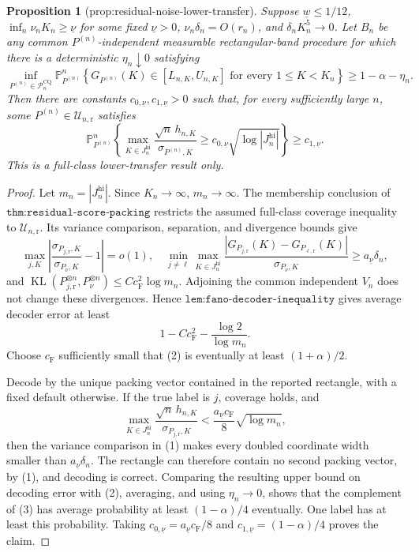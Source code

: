 \documentclass{article}
\newtheorem{proposition}{Proposition}
\begin{document}
\begin{proposition}[prop:residual-noise-lower-transfer]\label{prop:residual-noise-lower-transfer}
Suppose \(\underline w\leq1/12\), \(\inf_n\nu_nK_n\geq\underline\nu\) for some fixed \(\underline\nu>0\), \(\nu_n\delta_n=O(r_n)\), and \(\delta_nK_n^5\to0\).  Let \(B_n\) be any common \(P^{(n)}\)-independent measurable rectangular-band procedure for which there is a deterministic \(\eta_n\downarrow0\) satisfying
\[
 \inf_{P^{(n)}\in\mathcal P_n^{\mathrm{CQ}}}
 \mathbb P_{P^{(n)}}^n\!\left\{G_{P^{(n)}}(K)\in[L_{n,K},U_{n,K}]
 \text{ for every }1\leq K<K_n\right\}\geq1-\alpha-\eta_n.
\]
Then there are constants \(c_{0,\underline\nu},c_{1,\underline\nu}>0\) such that, for every sufficiently large \(n\), some \(P^{(n)}\in\mathcal U_{n,\mathrm r}\) satisfies
\[
 \mathbb P_{P^{(n)}}^n\!\left\{
 \max_{K\in J_n^{\mathrm{hi}}}\frac{\sqrt n\,h_{n,K}}{\sigma_{P^{(n)},K}}
 \geq c_{0,\underline\nu}\sqrt{\log|J_n^{\mathrm{hi}}|}\right\}
 \geq c_{1,\underline\nu}.
\]
This is a full-class lower-transfer result only.
\end{proposition}
\begin{proof}
Let \(m_n=|J_n^{\mathrm{hi}}|\).  Since \(K_n\to\infty\), \(m_n\to\infty\).  The membership conclusion of \(\texttt{thm:residual-score-packing}\) restricts the assumed full-class coverage inequality to \(\mathcal U_{n,\mathrm r}\).  Its variance comparison, separation, and divergence bounds give
\[
 \max_{j,K}\left|\frac{\sigma_{P_{j,\mathrm r},K}}{\sigma_{P_\nu,K}}-1\right|=o(1),
 \quad
 \min_{j\ne\ell}\max_{K\in J_n^{\mathrm{hi}}}
 \frac{|G_{P_{j,\mathrm r}}(K)-G_{P_{\ell,\mathrm r}}(K)|}{\sigma_{P_\nu,K}}
 \geq a_{\underline\nu}\delta_n,                                       \tag{1}
\]
and \(\operatorname{KL}(P_{j,\mathrm r}^{\otimes n},P_\nu^{\otimes n})\leq Cc_{\mathrm F}^2\log m_n\).  Adjoining the common independent \(V_n\) does not change these divergences.  Hence \(\texttt{lem:fano-decoder-inequality}\) gives average decoder error at least
\[
 1-Cc_{\mathrm F}^2-\frac{\log2}{\log m_n}.                              \tag{2}
\]
Choose \(c_{\mathrm F}\) sufficiently small that (2) is eventually at least \((1+\alpha)/2\).

Decode by the unique packing vector contained in the reported rectangle, with a fixed default otherwise.  If the true label is \(j\), coverage holds, and
\[
 \max_{K\in J_n^{\mathrm{hi}}}\frac{\sqrt n\,h_{n,K}}{\sigma_{P_{j,\mathrm r},K}}
 <\frac{a_{\underline\nu}c_{\mathrm F}}8\sqrt{\log m_n},                \tag{3}
\]
then the variance comparison in (1) makes every doubled coordinate width smaller than \(a_{\underline\nu}\delta_n\).  The rectangle can therefore contain no second packing vector, by (1), and decoding is correct.  Comparing the resulting upper bound on decoding error with (2), averaging, and using \(\eta_n\to0\), shows that the complement of (3) has average probability at least \((1-\alpha)/4\) eventually.  One label has at least this probability.  Taking \(c_{0,\underline\nu}=a_{\underline\nu}c_{\mathrm F}/8\) and \(c_{1,\underline\nu}=(1-\alpha)/4\) proves the claim.
\end{proof}
\end{document}

